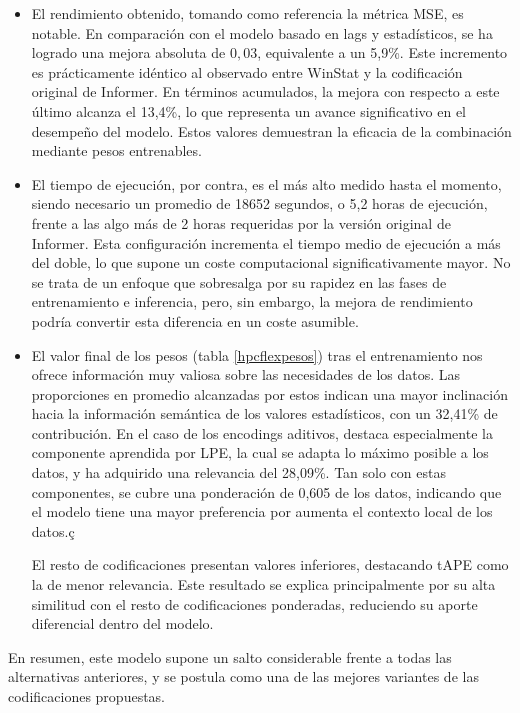 \begin{itemize}
	 \item El rendimiento obtenido, tomando como referencia la métrica MSE, es notable. En comparación con el modelo basado en lags y estadísticos, se ha logrado una mejora absoluta de $0,03$, equivalente a un 5,9\%. Este incremento es prácticamente idéntico al observado entre {WinStat} y la codificación original de {Informer}. En términos acumulados, la mejora con respecto a este último alcanza el 13,4\%, lo que representa un avance significativo en el desempeño del modelo. Estos valores demuestran la eficacia de la combinación mediante pesos entrenables.
	\item El tiempo de ejecución, por contra, es el más alto medido hasta el momento, siendo necesario un promedio de 18652 segundos, o 5,2 horas de ejecución, frente a las algo más de 2 horas requeridas por la versión original de Informer. Esta configuración incrementa el tiempo medio de ejecución a más del doble, lo que supone un coste computacional significativamente mayor. No se trata de un enfoque que sobresalga por su rapidez en las fases de entrenamiento e inferencia, pero, sin embargo, la mejora de rendimiento podría convertir esta diferencia en un coste asumible.
	\item El valor final de los pesos (tabla \ref{hpcflexpesos}) tras el entrenamiento nos ofrece información muy valiosa sobre las necesidades de los datos. Las proporciones en promedio alcanzadas por estos indican una mayor inclinación hacia la información semántica de los valores estadísticos, con un 32,41\% de contribución. En el caso de los encodings aditivos, destaca especialmente la componente aprendida por LPE, la cual se adapta lo máximo posible a los datos, y ha adquirido una relevancia del 28,09\%. Tan solo con estas componentes, se cubre una ponderación de 0,605 de los datos, indicando que el modelo tiene una mayor preferencia por aumenta el contexto local de los datos.ç
	
	 El resto de codificaciones presentan valores inferiores, destacando tAPE como la de menor relevancia. Este resultado se explica principalmente por su alta similitud con el resto de codificaciones ponderadas, reduciendo su aporte diferencial dentro del modelo.
	
\end{itemize}

En resumen, este modelo supone un salto considerable frente a todas las alternativas anteriores, y se postula como una de las mejores variantes de las codificaciones propuestas.

